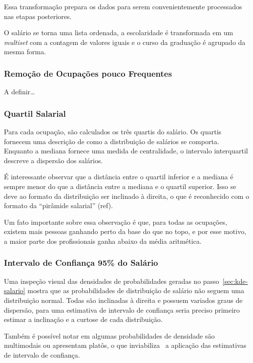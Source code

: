 \documentclass[12pt,a4paper]{article}
\begin{document}
Essa transformação prepara os dados para serem convenientemente processados nas etapas posteriores.

O salário se torna uma lista ordenada, a escolaridade é transformada em um \textit{multiset} com a contagem de valores iguais e o  curso da graduação é agrupado da mesma forma.

\subsubsection{Remoção de Ocupações pouco Frequentes}

A definir\ldots

\subsubsection{Quartil Salarial}

Para cada ocupação, são calculados os três quartis do salário. Os quartis fornecem uma descrição de como a distribuição de salários se comporta. Enquanto a mediana fornece uma medida de centralidade, o intervalo interquartil descreve a dispersão dos salários.

É interessante observar que a distância entre o quartil inferior e a mediana é sempre menor do que a distância entre a mediana e o quartil superior. Isso se deve ao formato da distribuição ser inclinado à direita, o que é reconhecido com o formato da \enquote{pirâmide salarial} (ref).

Um fato importante sobre essa observação é que, para todas as ocupações, existem mais pessoas ganhando perto da base do que no topo, e por esse motivo, a maior parte dos profissionais ganha abaixo da média aritmética.

\subsubsection{Intervalo de Confiança 95\% do Salário}

Uma inspeção visual das densidades de probabilidades geradas no passo~\ref{sec:kde-salario} mostra que as probabilidades de distribuição de salário não seguem uma distribuição normal. Todas são inclinadas à direita e possuem variados graus de dispersão, para uma estimativa de intervalo de confiança seria preciso primeiro estimar a inclinação e a curtose de cada distribuição.

Também é possível notar em algumas probabilidades de densidade são multimodais ou apresentam platôs, o que inviabiliza~ a aplicação das estimativas de intervalo de confiança.
\end{document}
